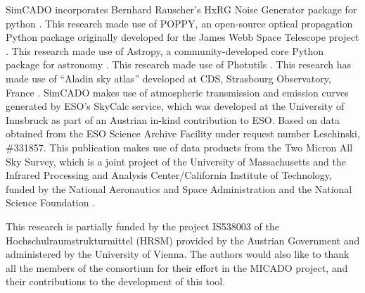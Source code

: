 \begin{acknowledgements}

SimCADO incorporates Bernhard Rauscher's HxRG Noise Generator package for python \citep{nghxrg}. 
This research made use of POPPY, an open-source optical propagation Python package originally developed for the James Webb Space Telescope project \citep{poppy}. 
This research made use of Astropy, a community-developed core Python package for astronomy \citep{astropy, astropy2}. 
This research made use of Photutils \citep{photutils}. 
This research has made use of ``Aladin sky atlas'' developed at CDS, Strasbourg Observatory, France \citep{aladin, aladinlite}.
SimCADO makes use of atmospheric transmission and emission curves generated by ESO's SkyCalc service, which was developed at the University of Innsbruck as part of an Austrian in-kind contribution to ESO. 
Based on data obtained from the ESO Science Archive Facility under request number Leschinski, \#331857.
This publication makes use of data products from the Two Micron All Sky Survey, which is a joint project of the University of Massachusetts and the Infrared Processing and Analysis Center/California Institute of Technology, funded by the National Aeronautics and Space Administration and the National Science Foundation \citep{2mass}.

This research is partially funded by the project IS538003 of the Hochschulraumstrukturmittel (HRSM) provided by the Austrian Government and administered by the University of Vienna. 
The authors would also like to thank all the members of the consortium for their effort in the MICADO project, and their contributions to the development of this tool.

\end{acknowledgements}